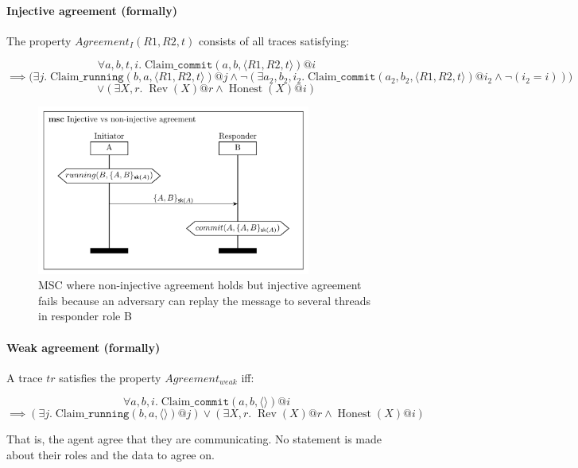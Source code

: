 \paragraph{Injective agreement (formally)}
The property $Agreement_I(R1, R2, t)$ consists of all traces satisfying:
\begin{tcolorbox}
$$ \forall a, b, t, i. \; \text{Claim\_}\texttt{commit}(a, b, \langle R1 , R2 , t \rangle )@i $$
$$ \implies \Big( \exists j. \; \text{Claim\_}\texttt{running}(b, a, \langle R1 , R2 , t \rangle )@j  \wedge \neg (\exists a_2, b_2, i_2 . \; \text{Claim\_}\texttt{commit}(a_2, b_2, \langle R1, R2, t \rangle )@i_2 \wedge \neg (i_2 = i)) \Big) $$
$$ \vee (\exists X, r . \; \operatorname{Rev}(X)@r \wedge \operatorname{Honest}(X)@i ) $$
\end{tcolorbox}

\begin{figure}[h]
    \centering
    \includegraphics[width=9cm]{images/ch7-msc-auth-noninjective-not-injective.png}
    \caption{MSC where non-injective agreement holds but injective agreement fails because an adversary can replay the message to several threads in responder role B}
    \label{fig:msc-auth-noninjective-not-injective}
\end{figure}

\paragraph{Weak agreement (formally)}
A trace $tr$ satisfies the property $Agreement_{weak}$ iff:
\begin{tcolorbox}
$$ \forall a, b, i. \; \text{Claim\_}\texttt{commit}(a, b, \langle\rangle)@i $$
$$ \implies (\exists j. \; \text{Claim\_}\texttt{running}(b, a, \langle\rangle)@j)
\vee (\exists X, r . \; \operatorname{Rev}(X)@r \wedge \operatorname{Honest}(X)@i) $$
\end{tcolorbox}

That is, the agent agree that they are communicating. No statement is made about their roles and the data to agree on.

